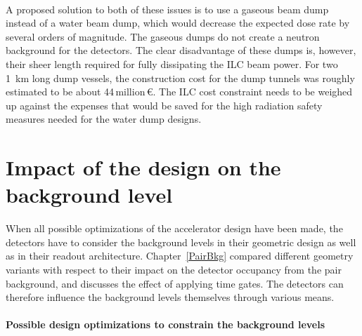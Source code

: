 \\A proposed solution to both of these issues is to use a gaseous beam dump instead of a water beam dump, which would decrease the expected dose rate by several orders of magnitude.
The gaseous dumps do not create a neutron background for the detectors.
The clear disadvantage of these dumps is, however, their sheer length required for fully dissipating the ILC beam power.
For two \SI{1}{\kilo\meter} long dump vessels, the construction cost for the dump tunnels was roughly estimated to be about 44\,million\,\euro.
The ILC cost constraint needs to be weighed up against the expenses that would be saved for the high radiation safety measures needed for the water dump designs.

\section{Impact of the \sid design on the background level}

When all possible optimizations of the accelerator design have been made, the detectors have to consider the background levels in their geometric design as well as in their readout architecture.
Chapter~\ref{PairBkg} compared different \sid geometry variants with respect to their impact on the detector occupancy from the pair background, and discusses the effect of applying time gates.
The detectors can therefore influence the background levels themselves through various means.

\paragraph{Possible \sid design optimizations to constrain the background levels}

